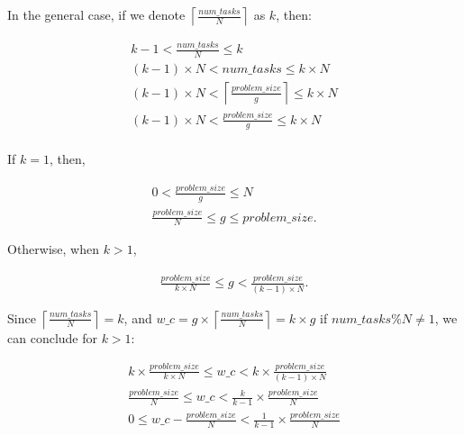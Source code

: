 In the general case, if we denote $\left \lceil{\frac{num\_{tasks}}{N}}\right \rceil$ as $k$, then:


\begin{equation}\label{formula8}
\begin{aligned}
k-1<{\frac{num\_{tasks}}{N}}\leq{k}\\
(k-1)\times{N}<num\_{tasks}\leq{k}\times{N}\\
(k-1)\times{N}<\left \lceil{\frac{problem\_{size}}{g}}\right \rceil\leq{k}\times{N}\\
(k-1)\times{N}<\frac{problem\_{size}}{g}\leq{{k}\times{N}}\\
\end{aligned}
\end{equation}

If $k=1$, then, 

\begin{equation}\label{formula9}
\begin{aligned}
0<\frac{problem\_{size}}{g}\leq{N}\\
\frac{problem\_{size}}{N}\leq{g}\leq{problem\_{size}}.
\end{aligned}
\end{equation}

Otherwise, when $k>1$,

\begin{equation}\label{formula10}
\begin{aligned}
\frac{problem\_{size}}{k\times{N}}\leq{g}<\frac{problem\_{size}}{(k-1)\times{N}}.
\end{aligned}
\end{equation}

Since $\left \lceil{\frac{num\_{tasks}}{N}}\right \rceil=k$, and $w\_c={g\times\left \lceil{\frac{num\_{tasks}}{N}}\right \rceil}={k\times{g}}$ if $num\_{tasks}\%{N}\neq{1}$, we can conclude for $k>1$:

\begin{equation}\label{formula11}
\begin{aligned}
k\times{\frac{problem\_{size}}{k\times{N}}}\leq{w\_c}<{k\times{\frac{problem\_{size}}{(k-1)\times{N}}}}\\
\frac{problem\_{size}}{{N}}\leq{w\_c}<{\frac{k}{k-1}\times{\frac{problem\_{size}}{N}}}\\
0\leq{w\_c-\frac{problem\_{size}}{N}}<\frac{1}{k-1}\times{\frac{problem\_{size}}{N}}
\end{aligned}
\end{equation}

